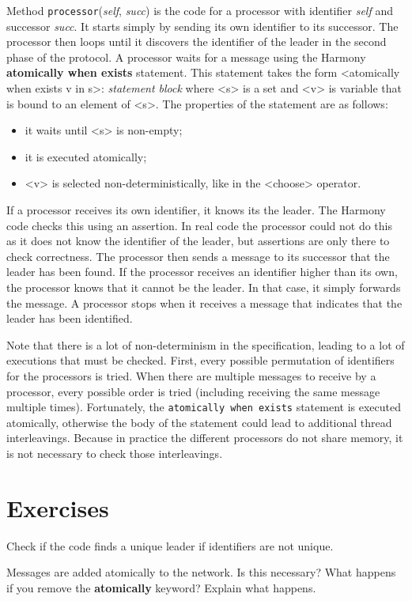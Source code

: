 \documentclass{report}
\begin{document}
{Method \texttt{processor}(\textit{self}, \textit{succ}) is the
code for a processor with identifier \textit{self} and successor
\textit{succ}.
It starts simply by sending its own identifier to its successor.
The processor then loops until it discovers the identifier of the
leader in the second phase of the protocol.
A processor waits for a message using the Harmony
\textbf{atomically when exists} statement.
This statement takes the form <{atomically when exists v in s}>: \emph{statement block}
where <{s}> is a set and <{v}> is variable that is bound to an element of <{s}>.
The properties of the statement are as follows:
\begin{itemize}
\item it waits until <{s}> is non-empty;
\item it is executed atomically;
\item <{v}> is selected non-deterministically, like in the <{choose}> operator.
\end{itemize}

If a processor receives its own identifier, it knows its the leader.
The Harmony code checks this using an assertion.
In real code the processor could not do this as it does not know
the identifier of the leader, but assertions are only there to check
correctness.
The processor then sends a message to its successor that the leader
has been found.
If the processor receives an identifier higher than its own, the
processor knows that it cannot be the leader.
In that case, it simply forwards the message.
A processor stops when it receives a message that indicates that
the leader has been identified.

Note that there is a lot of non-determinism in the specification, leading
to a lot of executions that must be checked.
First, every possible permutation of identifiers for the processors
is tried.  When there are multiple messages to receive by a processor,
every possible order is tried (including receiving the same message
multiple times).  Fortunately, the \texttt{atomically when exists} statement
is executed
atomically, otherwise the body of the statement could lead to additional
thread interleavings.  Because in practice the different processors do
not share memory, it is not necessary to check those interleavings.

\section*{Exercises}
\begin{problems}
\item Check if the code finds a unique leader if identifiers are not unique.
\item Messages are added atomically to the network.  Is this necessary?
What happens if you remove the \textbf{atomically} keyword?  Explain what happens.
\end{problems}

}
\end{document}
